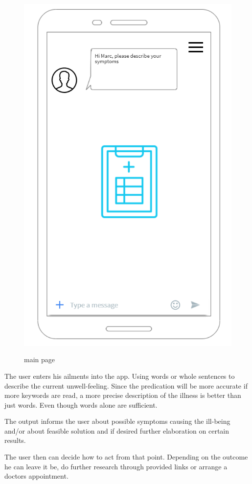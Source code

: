 \documentclass[12pt]{article}
\theoremstyle{definition}
\begin{document}
\begin{minipage}{0.4\textwidth}
\begin{figure}[H]
\centering
\includegraphics[scale=.8]{SystemSpec/Usecases/Mocks/MockOverview.PNG}\\
\caption{\label{fig:blue_rectangle} main page}
\end{figure}
\end{minipage} \hfill
\begin{minipage}{0.6\textwidth}

The user enters his ailments into the app. Using words or whole sentences to describe the current unwell-feeling. Since the predication will be more accurate if more keywords are read, a more precise description of the
illness is better than just words. Even though words alone are sufficient.

The output informs the user about possible symptoms causing the ill-being and/or about feasible solution and if desired further elaboration on certain results.

The user then can decide how to act from that point. Depending on the outcome he can leave it be, do further research through provided links or arrange a doctors appointment.

\end{minipage}
\end{document}
